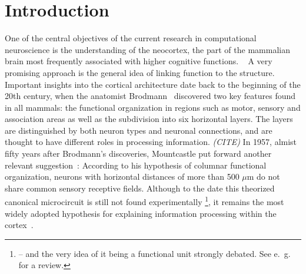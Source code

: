 \section{Introduction}
\label{sec:intro}

One of the central objectives of the current research in computational neuroscience
is the understanding of the neocortex, the part of the mammalian brain 
most frequently associated with higher cognitive functions.%
~\cite{lui2011development}
A very promising approach is the general idea of linking function to 
the structure. Important insights into the cortical architecture
date back to the beginning of the 20th century, when 
the anatomist Brodmann~\cite{brodmann1909vergleichende} 
discovered two key features found in all mammals:
the functional organization in regions such as motor, 
sensory and association areas as well as the subdivision into six horizontal 
layers. The layers are distinguished by both neuron types and neuronal connections, 
and are thought to have different roles in processing information. \emph{(CITE)}
In 1957, almist fifty years after Brodmann's discoveries, 
Mountcastle put forward another relevant suggestion~\cite{mountcastle1957modality}:
According to his hypothesis of columnar functional organization, neurons with horizontal 
distances of more than 500 $\mu$m do not share common sensory receptive fields.
Although to the date this theorized canonical microcircuit is still not found experimentally%
\footnote{
-- and the very idea of it being a functional unit strongly debated. See e.~g.~%
\cite{horton2005cortical} for a review.
}, it remains the most widely adopted hypothesis for explaining information processing 
within the cortex~\cite{defelipe2012neocortical}.

